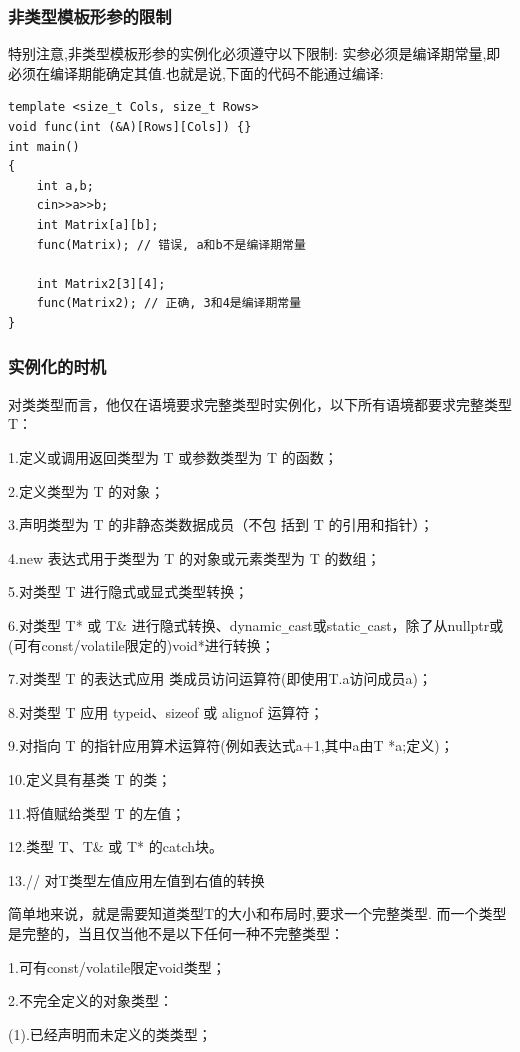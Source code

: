 \documentclass[UTF8]{ctexart}
\begin{document}
\subsubsection{非类型模板形参的限制}
特别注意,非类型模板形参的实例化必须遵守以下限制: 实参必须是编译期常量,即必须在编译期能确定其值.也就是说,下面的代码不能通过编译:
\begin{lstlisting}
template <size_t Cols, size_t Rows>
void func(int (&A)[Rows][Cols]) {}
int main()
{
    int a,b;
    cin>>a>>b;
    int Matrix[a][b];
    func(Matrix); // 错误, a和b不是编译期常量

    int Matrix2[3][4];
    func(Matrix2); // 正确, 3和4是编译期常量
}
\end{lstlisting}

\subsubsection{实例化的时机}
对类类型而言，他仅在语境要求完整类型时实例化，以下所有语境都要求完整类型 T：

1.定义或调用返回类型为 T 或参数类型为 T 的函数；

2.定义类型为 T 的对象；

3.声明类型为 T 的非静态类数据成员（不包
括到 T 的引用和指针）；

4.new 表达式用于类型为 T 的对象或元素类型为 T 的数组；

5.对类型 T 进行隐式或显式类型转换；

6.对类型 T* 或 T\& 进行隐式转换、dynamic\verb|_|cast或static\verb|_|cast，除了从nullptr或(可有const/volatile限定的)void*进行转换；

7.对类型 T 的表达式应用 类成员访问运算符(即使用T.a访问成员a)；

8.对类型 T 应用 typeid、sizeof 或 alignof 运算符；

9.对指向 T 的指针应用算术运算符(例如表达式a+1,其中a由T *a;定义)；

10.定义具有基类 T 的类；

11.将值赋给类型 T 的左值；

12.类型 T、T\& 或 T* 的catch块。

13.// 对T类型左值应用左值到右值的转换

简单地来说，就是需要知道类型T的大小和布局时,要求一个完整类型. 而一个类型是完整的，当且仅当他不是以下任何一种不完整类型：

1.可有const/volatile限定void类型；

2.不完全定义的对象类型：

    (1).已经声明而未定义的类类型；
    
\end{document}
